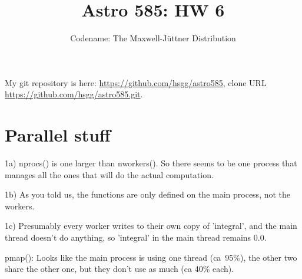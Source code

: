 \documentclass[11pt]{article}
\title{Astro 585: HW 6}
\author{Codename: The Maxwell-Jüttner Distribution}
\begin{document}
\maketitle

My git repository is here: \url{https://github.com/hsgg/astro585}, clone URL
\url{https://github.com/hsgg/astro585.git}.


\section{Parallel stuff}

1a) nprocs() is one larger than nworkers(). So there seems to be one process
that manages all the ones that will do the actual computation.

1b) As you told us, the functions are only defined on the main process, not the
workers.

1c) Presumably every worker writes to their own copy of 'integral', and the
main thread doesn't do anything, so 'integral' in the main thread remains 0.0.

pmap(): Looks like the main process is using one thread (ca~95\%), the other
two share the other one, but they don't use as much (ca 40\% each).
\end{document}
